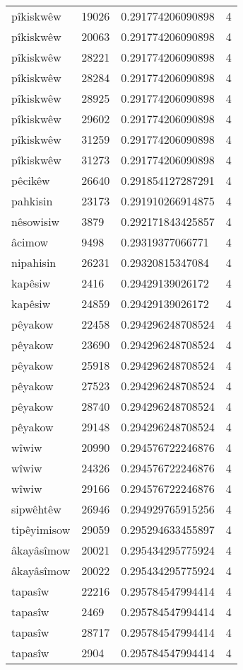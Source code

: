 \begin{longtable}{llll}
pîkiskwêw & 19026 & 0.291774206090898 & 4 \\
pîkiskwêw & 20063 & 0.291774206090898 & 4 \\
pîkiskwêw & 28221 & 0.291774206090898 & 4 \\
pîkiskwêw & 28284 & 0.291774206090898 & 4 \\
pîkiskwêw & 28925 & 0.291774206090898 & 4 \\
pîkiskwêw & 29602 & 0.291774206090898 & 4 \\
pîkiskwêw & 31259 & 0.291774206090898 & 4 \\
pîkiskwêw & 31273 & 0.291774206090898 & 4 \\
pêcikêw & 26640 & 0.291854127287291 & 4 \\
pahkisin & 23173 & 0.291910266914875 & 4 \\
nêsowisiw & 3879 & 0.292171843425857 & 4 \\
âcimow & 9498 & 0.29319377066771 & 4 \\
nipahisin & 26231 & 0.29320815347084 & 4 \\
kapêsiw & 2416 & 0.29429139026172 & 4 \\
kapêsiw & 24859 & 0.29429139026172 & 4 \\
pêyakow & 22458 & 0.294296248708524 & 4 \\
pêyakow & 23690 & 0.294296248708524 & 4 \\
pêyakow & 25918 & 0.294296248708524 & 4 \\
pêyakow & 27523 & 0.294296248708524 & 4 \\
pêyakow & 28740 & 0.294296248708524 & 4 \\
pêyakow & 29148 & 0.294296248708524 & 4 \\
wîwiw & 20990 & 0.294576722246876 & 4 \\
wîwiw & 24326 & 0.294576722246876 & 4 \\
wîwiw & 29166 & 0.294576722246876 & 4 \\
sipwêhtêw & 26946 & 0.294929765915256 & 4 \\
tipêyimisow & 29059 & 0.295294633455897 & 4 \\
âkayâsîmow & 20021 & 0.295434295775924 & 4 \\
âkayâsîmow & 20022 & 0.295434295775924 & 4 \\
tapasîw & 22216 & 0.295784547994414 & 4 \\
tapasîw & 2469 & 0.295784547994414 & 4 \\
tapasîw & 28717 & 0.295784547994414 & 4 \\
tapasîw & 2904 & 0.295784547994414 & 4 \\

\end{longtable}
